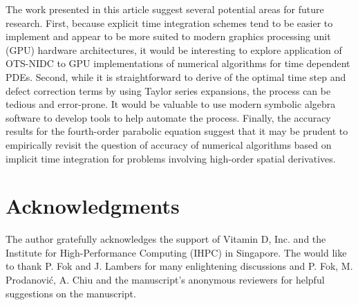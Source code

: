 \documentclass[fleqn,12pt,twoside]{article}
\begin{document}
The work presented in this article suggest several potential areas for future
research.  First, because explicit time integration schemes tend to be easier
to implement and appear to be more suited to modern graphics processing unit
(GPU) hardware architectures,
it would be interesting to explore application of OTS-NIDC to GPU
implementations of numerical algorithms for time dependent PDEs.  Second,
while it is straightforward to derive of the optimal time step and defect
correction terms by using Taylor series expansions, the process can be tedious
and error-prone.  It would be valuable to use modern symbolic algebra software
to develop tools to help automate the process.  Finally, the accuracy results
for the fourth-order parabolic equation suggest that it may be prudent to 
empirically revisit the question of accuracy of numerical algorithms based
on implicit time integration for problems involving high-order spatial
derivatives. 

\section*{Acknowledgments}
The author gratefully acknowledges the support of Vitamin D, Inc.
and the Institute for High-Performance Computing (IHPC) in Singapore. 
The would like to thank P. Fok and J. Lambers for many enlightening 
discussions and P. Fok, M. Prodanovi\'c, A. Chiu and the manuscript's
anonymous reviewers for helpful suggestions on the manuscript.  


%
\end{document}
